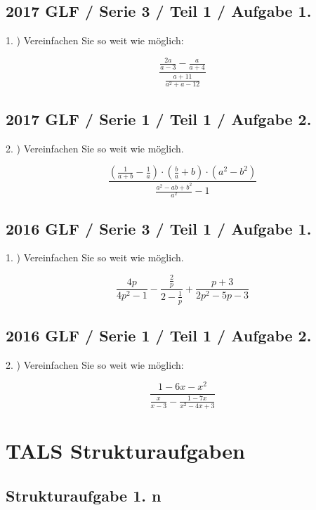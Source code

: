 \subsection*{2017 GLF / Serie 3 / Teil 1 / Aufgabe 1.}

1. ) Vereinfachen Sie so weit wie möglich:

$$\frac{\frac{2a}{a-3}-\frac{a}{a+4}}{\frac{a+11}{a^2+a-12}}$$

\subsection*{2017 GLF / Serie 1 / Teil 1 / Aufgabe 2.}

2. ) Vereinfachen Sie so weit wie möglich.

$$\frac{\left(\frac1{a+b} - \frac1a \right) \cdot{} \left(\frac{b}a + b\right) \cdot{} \left(a^2-b^2\right)}{\frac{a^2-ab+b^2}{a^2}-1}$$

\subsection*{2016 GLF / Serie 3 / Teil 1 / Aufgabe 1.}

1. ) Vereinfachen Sie so weit wie möglich.

$$\frac{4p}{4p^2-1} - \frac{\frac2p}{2-\frac1p} + \frac{p+3}{2p^2-5p-3}$$


\subsection*{2016 GLF / Serie 1 / Teil 1 / Aufgabe 2.}

2. ) Vereinfachen Sie so weit wie möglich:

$$\frac{1-6x-x^2}{\frac{x}{x-3} - \frac{1-7x}{x^2-4x+3}}$$

\newpage
\section*{TALS Strukturaufgaben}

\subsection*{Strukturaufgabe 1. n}

